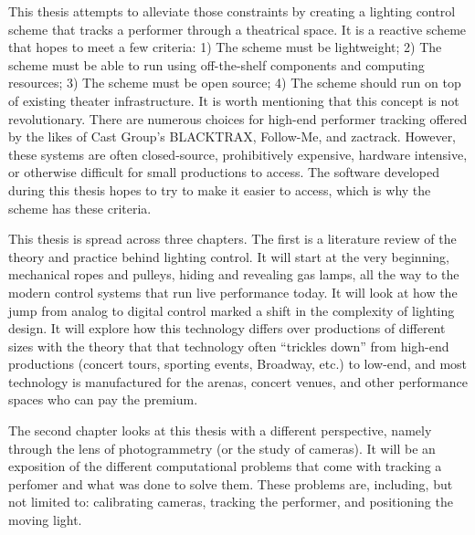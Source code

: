 \documentclass[
    12pt,
    twoside,
    bibstyle=chicago,
    headerstyle=uppercase,
	bibfile=thesis.bib
]{reedthesis}
\begin{document}

    This thesis attempts to alleviate those constraints by creating a lighting control scheme that tracks a performer through a theatrical space. It is a reactive scheme that hopes to meet a few criteria: 1) The scheme must be lightweight; 2) The scheme must be able to run using off-the-shelf components and computing resources; 3) The scheme must be open source; 4) The scheme should run on top of existing theater infrastructure. It is worth mentioning that this concept is not revolutionary. There are numerous choices for high-end performer tracking offered by the likes of Cast Group's BLACKTRAX, Follow-Me, and zactrack. However, these systems are often closed-source, prohibitively expensive, hardware intensive, or otherwise difficult for small productions to access. The software developed during this thesis hopes to try to make it easier to access, which is why the scheme has these criteria. 
    
    
    This thesis is spread across three chapters. The first is a literature review of the theory and practice behind lighting control. It will start at the very beginning, mechanical ropes and pulleys, hiding and revealing gas lamps, all the way to the modern control systems that run live performance today. It will look at how the jump from analog to digital control marked a shift in the complexity of lighting design. It will explore how this technology differs over productions of different sizes with the theory that that technology often “trickles down” from high-end productions (concert tours, sporting events, Broadway, etc.) to low-end, and most technology is manufactured for the arenas, concert venues, and other performance spaces who can pay the premium.
    
    
    The second chapter looks at this thesis with a different perspective, namely through the lens of photogrammetry (or the study of cameras). It will be an exposition of the different computational problems that come with tracking a perfomer and what was done to solve them. These problems are, including, but not limited to: calibrating cameras, tracking the performer, and positioning the moving light.
    
\end{document}
